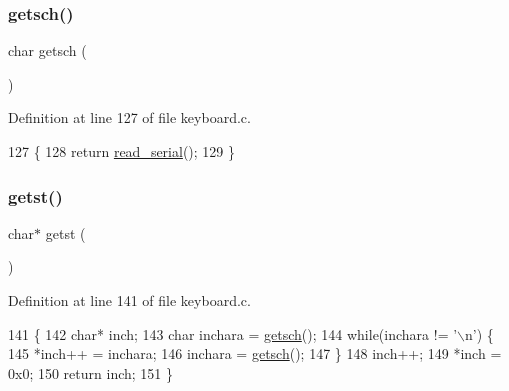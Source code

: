 \subsubsection{\texorpdfstring{getsch()}{getsch()}}
{\footnotesize\ttfamily char getsch (\begin{DoxyParamCaption}{ }\end{DoxyParamCaption})}



Definition at line 127 of file keyboard.\+c.


\begin{DoxyCode}
127               \{
128     \textcolor{keywordflow}{return} \hyperlink{a00050_ad343a7018f74662f794968dfa0523841_ad343a7018f74662f794968dfa0523841}{read\_serial}();
129 \}
\end{DoxyCode}
\mbox{\label{a00032_ab88a2e96bbe585e228a5b201435c0240_ab88a2e96bbe585e228a5b201435c0240}} 
\subsubsection{\texorpdfstring{getst()}{getst()}}
{\footnotesize\ttfamily char$\ast$ getst (\begin{DoxyParamCaption}{ }\end{DoxyParamCaption})}



Definition at line 141 of file keyboard.\+c.


\begin{DoxyCode}
141               \{
142     \textcolor{keywordtype}{char}* inch;
143     \textcolor{keywordtype}{char} inchara = \hyperlink{a00032_aa7ee03b27a489828ce588d0fc023cab3_aa7ee03b27a489828ce588d0fc023cab3}{getsch}();
144     \textcolor{keywordflow}{while}(inchara != \textcolor{charliteral}{'\(\backslash\)n'}) \{
145         *inch++ = inchara;
146         inchara = \hyperlink{a00032_aa7ee03b27a489828ce588d0fc023cab3_aa7ee03b27a489828ce588d0fc023cab3}{getsch}();
147     \}
148     inch++;
149     *inch = 0x0;
150     \textcolor{keywordflow}{return} inch;
151 \}
\end{DoxyCode}
\mbox{\label{a00032_aabdb223e5290f3b3c07bc82d075b87d7_aabdb223e5290f3b3c07bc82d075b87d7}} 
